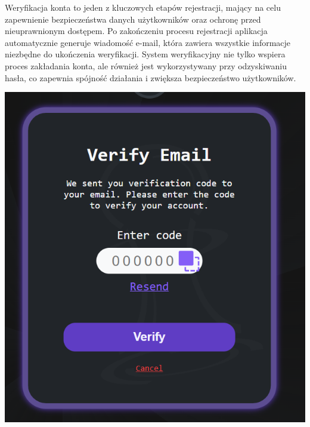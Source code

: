 \documentclass[12pt,a4paper]{article}
\begin{document}
\begin{minipage}[t]{0.45\textwidth} 
    \vspace{0pt} 
    \raggedright 
    Weryfikacja konta to jeden z kluczowych etapów rejestracji, mający na celu zapewnienie bezpieczeństwa danych użytkowników oraz ochronę przed nieuprawnionym dostępem. Po zakończeniu procesu rejestracji aplikacja automatycznie generuje wiadomość e-mail, która zawiera wszystkie informacje niezbędne do ukończenia weryfikacji. System weryfikacyjny nie tylko wspiera proces zakładania konta, ale również jest wykorzystywany przy odzyskiwaniu hasła, co zapewnia spójność działania i zwiększa bezpieczeństwo użytkowników. 
\end{minipage} 
\hfill 
\begin{minipage}[t]{0.45\textwidth} 
    \vspace{0pt} 
    \centering 
    \includegraphics[width=\linewidth]{images/ins_min_ver.png} 
\end{minipage}

\vspace{1cm}
\end{document}
